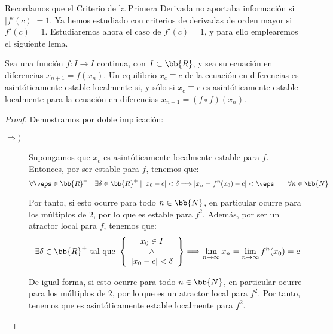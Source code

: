 Recordamos que el Criterio de la Primera Derivada no aportaba información si $|f'(c)|=1$. Ya hemos estudiado con criterios de derivadas de orden mayor si $f'(c)=1$. Estudiaremos ahora el caso de $f'(c)=1$, y para ello emplearemos el siguiente lema.
\begin{lema} \label{lema:f2siif}
    Sea una función $f:I\rightarrow I$ continua, con $I\subset \bb{R}$, y sea su ecuación en diferencias $x_{n+1}=f(x_n)$.
    Un equilibrio $x_c \equiv c$ de la ecuación en diferencias es asintóticamente estable localmente si, y sólo si $x_c\equiv c$ es asintóticamente estable localmente para la ecuación en diferencias $x_{n+1} = (f \circ f)(x_n)$.
\end{lema}
\begin{proof}
    Demostramos por doble implicación:
    \begin{description}
        \item[$\Longrightarrow)$] Supongamos que $x_c$ es asintóticamente localmente estable para $f$. Entonces, por ser estable para $f$, tenemos que:
        \begin{equation*}
            \forall \veps \in \bb{R}^+ \quad \exists \delta \in \bb{R}^+ \mid |x_0-c| < \delta \Longrightarrow |x_n=f^n(x_0)-c|<\veps \qquad \forall n\in \bb{N}
        \end{equation*}

        Por tanto, si esto ocurre para todo $n\in \bb{N}$, en particular ocurre para los múltiplos de $2$, por lo que es estable para $f^2$. Además, por ser un atractor local para $f$, tenemos que:
        \begin{equation*}
            \exists \delta \in \bb{R}^+ \text{ tal que } \left\{\begin{array}{c}
                x_0\in I \\ \land \\ |x_0-c| < \delta
            \end{array}\right\} \Longrightarrow \lim_{n \to \infty} x_n = \lim_{n \to \infty} f^n(x_0)= c
        \end{equation*}

        De igual forma,  si esto ocurre para todo $n\in \bb{N}$, en particular ocurre para los múltiplos de $2$, por lo que es un atractor local para $f^2$. Por tanto, tenemos que es asintóticamente estable localmente para $f^2$.


\end{description}
\end{proof}
